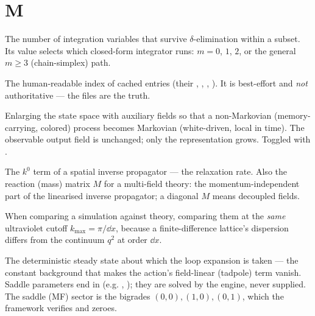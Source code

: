 \section*{M}
\begin{description}[leftmargin=0pt,style=nextline]

  \item[\code{m} (after delta)] The number of integration variables that survive
        $\delta$-elimination within a subset. Its value selects which closed-form
        integrator runs: $m=0$, $1$, $2$, or the general $m\ge 3$
        (chain-simplex) path.

  \item[\code{manifest.json}] The human-readable index of cached entries (their
        , , , ). It is
        best-effort and \emph{not} authoritative --- the  files are the
        truth.

  \item[Markovian embedding / Markovianization] Enlarging the state space with
        auxiliary fields so that a non-Markovian (memory-carrying, colored) process
        becomes Markovian (white-driven, local in time). The observable output field
        is unchanged; only the representation grows. Toggled with
        .

  \item[Mass $A$ (a.k.a. $\mu$)] The $k^{0}$ term of a spatial inverse propagator
        --- the relaxation rate. Also the reaction (mass) matrix $M$ for a
        multi-field theory: the momentum-independent part of the linearised inverse
        propagator; a diagonal $M$ means decoupled fields.

  \item[Matched-cutoff principle] When comparing a simulation against theory,
        comparing them at the \emph{same} ultraviolet cutoff $k_{\max}=\pi/\dd x$,
        because a finite-difference lattice's dispersion differs from the continuum
        $q^{2}$ at order $\dd x$.

  \item[Mean field / saddle point ($\varphi^{*}$)] The deterministic steady state
        about which the loop expansion is taken --- the constant background that
        makes the action's field-linear (tadpole) term vanish. Saddle parameters end
        in  (e.g. , ); they are solved by the
        engine, never supplied. The saddle (MF) sector is the bigrades
        $(0,0),(1,0),(0,1)$, which the framework verifies and zeroes.


\end{description}
